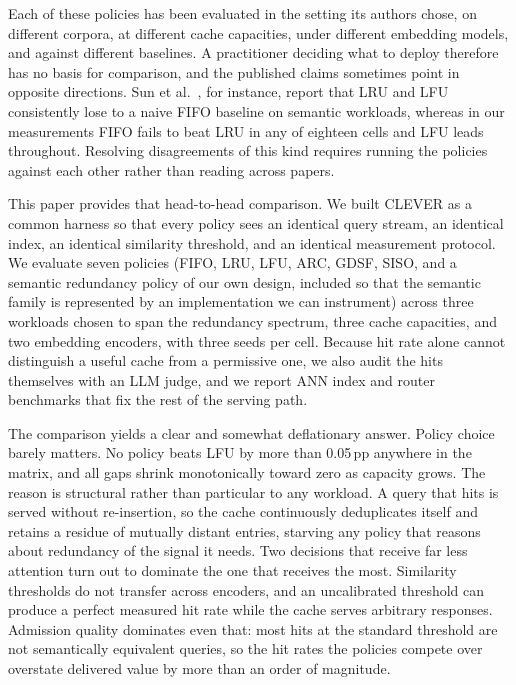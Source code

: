 \documentclass[sigconf,nonacm]{acmart}
\begin{document}
Each of these policies has been evaluated in the setting its authors chose, on different corpora, at different cache capacities, under different embedding models, and against different baselines. A practitioner deciding what to deploy therefore has no basis for comparison, and the published claims sometimes point in opposite directions. Sun et al.\ \cite{sun2026solar}, for instance, report that LRU and LFU consistently lose to a naive FIFO baseline on semantic workloads, whereas in our measurements FIFO fails to beat LRU in any of eighteen cells and LFU leads throughout. Resolving disagreements of this kind requires running the policies against each other rather than reading across papers.

This paper provides that head-to-head comparison. We built CLEVER as a common harness so that every policy sees an identical query stream, an identical index, an identical similarity threshold, and an identical measurement protocol. We evaluate seven policies (FIFO, LRU, LFU, ARC, GDSF, SISO, and a semantic redundancy policy of our own design, included so that the semantic family is represented by an implementation we can instrument) across three workloads chosen to span the redundancy spectrum, three cache capacities, and two embedding encoders, with three seeds per cell. Because hit rate alone cannot distinguish a useful cache from a permissive one, we also audit the hits themselves with an LLM judge, and we report ANN index and router benchmarks that fix the rest of the serving path.

The comparison yields a clear and somewhat deflationary answer. Policy choice barely matters. No policy beats LFU by more than 0.05\,pp anywhere in the matrix, and all gaps shrink monotonically toward zero as capacity grows. The reason is structural rather than particular to any workload. A query that hits is served without re-insertion, so the cache continuously deduplicates itself and retains a residue of mutually distant entries, starving any policy that reasons about redundancy of the signal it needs. Two decisions that receive far less attention turn out to dominate the one that receives the most. Similarity thresholds do not transfer across encoders, and an uncalibrated threshold can produce a perfect measured hit rate while the cache serves arbitrary responses. Admission quality dominates even that: most hits at the standard threshold are not semantically equivalent queries, so the hit rates the policies compete over overstate delivered value by more than an order of magnitude.
\end{document}
